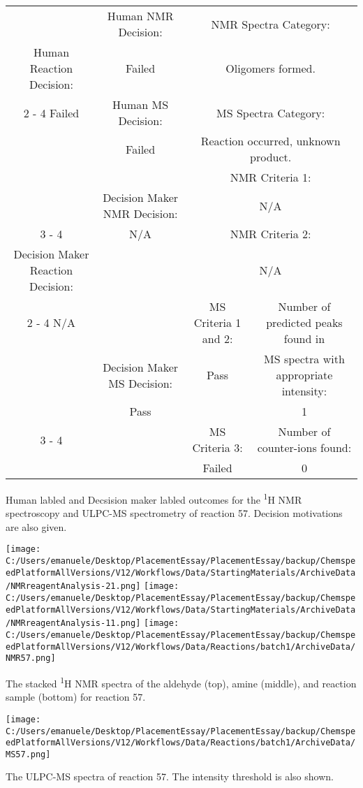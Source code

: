 \documentclass{article}%
\begin{document}
\begin{Decision Table}[H]%
\begin{tabular}{|c|c|c|c|}%
\hline%
&Human NMR Decision:&\multicolumn{2}{|c|}{NMR Spectra Category:}\\%
Human Reaction Decision:&Failed&\multicolumn{2}{|c|}{Oligomers formed.}\\%
\cline{2%
-%
4}%
Failed&Human MS Decision:&\multicolumn{2}{|c|}{MS Spectra Category:}\\%
&Failed&\multicolumn{2}{|c|}{Reaction occurred, unknown product.}\\%
\hline%
&&\multicolumn{2}{|c|}{NMR Criteria 1:}\\%
&Decision Maker NMR Decision:&\multicolumn{2}{|c|}{N/A}\\%
\cline{3%
-%
4}%
&N/A&\multicolumn{2}{|c|}{NMR Criteria 2:}\\%
Decision Maker Reaction Decision:&&\multicolumn{2}{|c|}{N/A}\\%
\cline{2%
-%
4}%
N/A&&MS Criteria 1 and 2:&Number of predicted peaks found in\\%
&Decision Maker MS Decision:&Pass&MS spectra with appropriate intensity:\\%
&Pass&&1\\%
\cline{3%
-%
4}%
&&MS Criteria 3:&Number of counter{-}ions found:\\%
&&Failed&0\\%
\hline%
\end{tabular}%
\caption{Human labled and Decsision maker labled outcomes for the \textsuperscript{1}H NMR spectroscopy and ULPC-MS spectrometry of reaction 57. Decision motivations are also given.}%
\end{Decision Table}%
\begin{NMR Spectra}[H]%
\begin{center}%
\texttt{[image: C:/Users/emanuele/Desktop/PlacementEssay/PlacementEssay/backup/ChemspeedPlatformAllVersions/V12/Workflows/Data/StartingMaterials/ArchiveData/NMRreagentAnalysis-21.png]}\hfill%
\texttt{[image: C:/Users/emanuele/Desktop/PlacementEssay/PlacementEssay/backup/ChemspeedPlatformAllVersions/V12/Workflows/Data/StartingMaterials/ArchiveData/NMRreagentAnalysis-11.png]}\hfill%
\texttt{[image: C:/Users/emanuele/Desktop/PlacementEssay/PlacementEssay/backup/ChemspeedPlatformAllVersions/V12/Workflows/Data/Reactions/batch1/ArchiveData/NMR57.png]}\hfill%
\end{center}%
\caption{The stacked \textsuperscript{1}H NMR spectra of the aldehyde (top), amine (middle), and reaction sample (bottom) for reaction 57.}%
\end{NMR Spectra}%
\begin{MS Spectra}[H]%
\begin{center}%
\texttt{[image: C:/Users/emanuele/Desktop/PlacementEssay/PlacementEssay/backup/ChemspeedPlatformAllVersions/V12/Workflows/Data/Reactions/batch1/ArchiveData/MS57.png]}\hfill%
\end{center}%
\caption{The ULPC-MS spectra of reaction 57. The intensity threshold is also shown.}%
\end{MS Spectra}%
\end{document}
